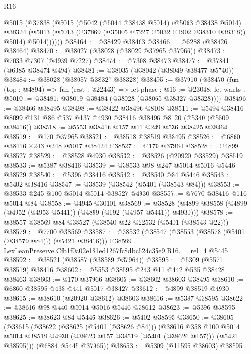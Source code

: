 \begin{lexlean}{R16}
\begin{coremodule}
      @5015
        (@37838
          (@5015
            (@5042
              (@5044 @38438 @5014)
              (@5063 @38438 @5014)
              @38324
              (@5013 (@5013 (@37869 (@35005 @7227 @5032 @4902 @38310 @38318)) @5014) @5014))))))
@38464 := @38429 @38463
@38466 := @5288 (@38426 @38464)
@38470 := @38027 (@38028 (@38029 @37965 @37966))
@38473 := @7033 @7307 (@4939 @7227)
@38474 := @7308 @38473
@38477 := @37841 (@6385 @38474 @494)
@38481 := @38035 (@38042 (@38049 @38477 @5740))
@38484 := @38028 (@38057 @38327 @38328)
@38495 := @37910
    (@38470
      (fun (top : @4894) =>
      fun (rest : @22443) =>
      let phase : @16 := @23048;
      let wants : @5010 := @38481; @38019 @38484 (@38028 (@38065 @38327 @38328))))
@38496 := @38466 @38495
@38498 := @38422 @38496 @8108
@38511 := @5494 @38416 @8099 @131 @86 @537 @137 @4930 @38416 @38496 @8120 (@5340 (@5509 @38416))
@38518 := @5553 @38416 @157 @11 @249 @536 @38425 @38464
@38519 := @170 @37965
@38521 := @38518 @38519 @38495
@38526 := @6860 @38416 @243 @248 @5017 @38424
@38527 := @170 @37964
@38528 := @4899 @38527
@38529 := @38528 @4930
@38532 := @38526 (@20920 @38529) @38519
@38533 := @5387 @38416
@38539 := @38533 @98 @247 @5014 @5016 @5446 @38529
@38540 := @5396 @38416
@38542 := @38540 @84 @5446
@38543 := @5402 @38416
@38547 := @38539 (@38542 (@5401 (@38543 @84)))
@38553 := @38533 @245 @100 @5014 @5014 @38527 @4930
@38557 := @7670 @38416 @116 @5014 @84
@38558 := @4945 @30101
@38569 := @38528 (@4899 @38558 (@4899 (@4952 (@4953 @5441)) (@4899 (@192 (@4957 @5441)) @4930)))
@38578 := @38557 @38569 @84 @38527 (@38540 @22 @22532 (@5401 (@38543 @22)))
@38579 := @7700 @38569
@38587 := @38532 (@38547 (@38553 (@38578 (@5401 (@38579 @84))) (@5421 @38416)))
@38589 := LexLeanPreserve.Cfb1f0a02e181ed1267fc8dbc524c35e9.R16.__rel_4 @5445
@38592 := @38521 (@38587 (@38589 @37964))
@38595 := @5309 (@5571 @38519) @38416
@38602 := @5553 @38595 @243 @11 @442 @535 @38428 @38463
@38603 := @170 @37966
@38605 := @38602 @38603 @38495
@38610 := @6860 @38595 @438 @441 @5017 @38427
@38612 := @4899 @38519 @4930
@38615 := @38610 (@20920 @38612) @38603
@38616 := @5387 @38595
@38622 := @38616 @98 @440 @5014 @5016 @5446 @38612
@38623 := @5396 @38595
@38625 := @38623 @84 @5446
@38626 := @5402 @38595
@38650 := @38605
    (@38615
      (@38622
        (@38625 (@5401 (@38626 @84)))
        (@38616
          @358
          @100
          @5014
          @5014
          @38519
          @4930
          (@38623 @157 @38519 (@5401 (@38626 @157)))
          (@5421 @38595)))
      (@6884 @5445 @37965))
@38653 := @5309 (@11595 @38603) @38595

\end{coremodule}
\end{lexlean}
